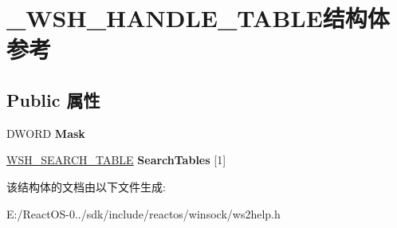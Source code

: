 \hypertarget{struct___w_s_h___h_a_n_d_l_e___t_a_b_l_e}{}\section{\+\_\+\+W\+S\+H\+\_\+\+H\+A\+N\+D\+L\+E\+\_\+\+T\+A\+B\+L\+E结构体 参考}
\label{struct___w_s_h___h_a_n_d_l_e___t_a_b_l_e}
\subsection*{Public 属性}
\begin{DoxyCompactItemize}
\item 
\mbox{\label{struct___w_s_h___h_a_n_d_l_e___t_a_b_l_e_a2260d7ff13d5bbdfd62fa12bff1e26a6}} 
D\+W\+O\+RD {\bfseries Mask}
\item 
\mbox{\label{struct___w_s_h___h_a_n_d_l_e___t_a_b_l_e_ab54583a01c9c35c5e963fefeff4b80fb}} 
\hyperlink{struct___w_s_h___s_e_a_r_c_h___t_a_b_l_e}{W\+S\+H\+\_\+\+S\+E\+A\+R\+C\+H\+\_\+\+T\+A\+B\+LE} {\bfseries Search\+Tables} \mbox{[}1\mbox{]}
\end{DoxyCompactItemize}


该结构体的文档由以下文件生成\+:\begin{DoxyCompactItemize}
\item 
E\+:/\+React\+O\+S-\/0../sdk/include/reactos/winsock/ws2help.\+h\end{DoxyCompactItemize}
